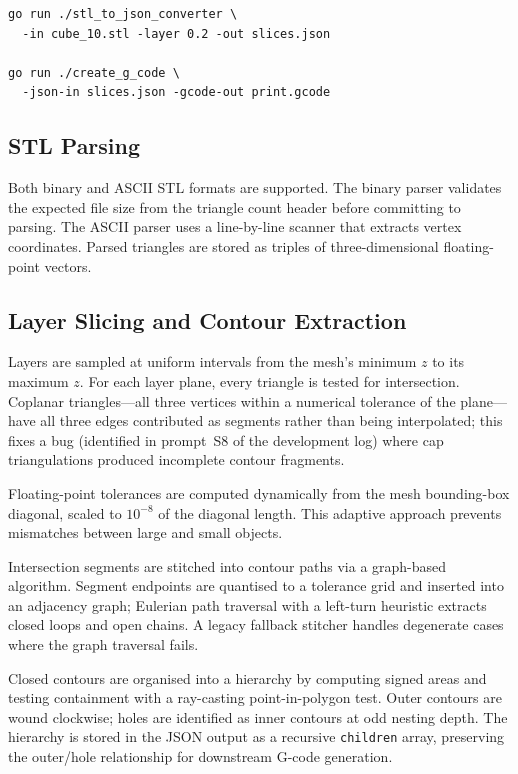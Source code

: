 \documentclass[10pt,twocolumn,a4paper]{article}
\begin{document}
\begin{lstlisting}[caption={Two-step CLI workflow without included parameters.},
	label={lst:workflow2}, language={}]
go run ./stl_to_json_converter \
  -in cube_10.stl -layer 0.2 -out slices.json
	
go run ./create_g_code \
  -json-in slices.json -gcode-out print.gcode
\end{lstlisting}

\subsection{STL Parsing}

Both binary and ASCII STL formats are supported.
The binary parser validates the expected file size from the
triangle count header before committing to parsing.
The ASCII parser uses a line-by-line scanner that extracts
vertex coordinates.
Parsed triangles are stored as triples of three-dimensional
floating-point vectors.

\subsection{Layer Slicing and Contour Extraction}

Layers are sampled at uniform intervals from the mesh's
minimum $z$ to its maximum $z$.
For each layer plane, every triangle is tested for intersection.
Coplanar triangles—all three vertices within a numerical
tolerance of the plane—have all three edges contributed as
segments rather than being interpolated; this fixes a bug
(identified in prompt~S8 of the development log) where cap
triangulations produced incomplete contour fragments.

Floating-point tolerances are computed dynamically from the
mesh bounding-box diagonal, scaled to $10^{-8}$ of the diagonal
length. This adaptive approach prevents mismatches between
large and small objects.

Intersection segments are stitched into contour paths
via a graph-based algorithm. Segment endpoints are quantised
to a tolerance grid and inserted into an adjacency graph;
Eulerian path traversal with a left-turn heuristic extracts
closed loops and open chains. A legacy fallback stitcher
handles degenerate cases where the graph traversal fails.

Closed contours are organised into a hierarchy by computing
signed areas and testing containment with a ray-casting
point-in-polygon test. Outer contours are wound clockwise;
holes are identified as inner contours at odd nesting depth.
The hierarchy is stored in the JSON output as a recursive
\texttt{children} array, preserving the outer/hole relationship
for downstream G-code generation.
\end{document}
